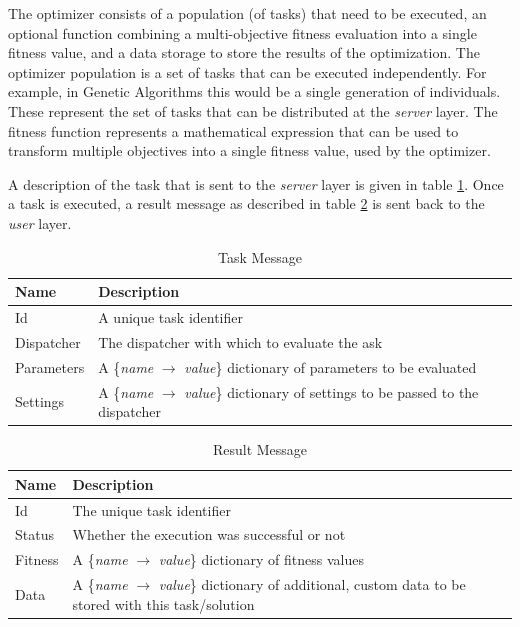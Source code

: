 \documentclass{article}
\begin{document}
The optimizer consists of a population (of tasks) that need to
be executed, an optional function combining a multi-objective fitness evaluation
into a single fitness value, and a data storage to store the results of the
optimization. The optimizer population is a set of tasks that can be executed
independently. For example, in Genetic Algorithms this would be a single
generation of individuals. These represent the set of tasks that can be
distributed at the \textit{server} layer. The fitness function represents
a mathematical expression that can be used to transform multiple objectives
into a single fitness value, used by the optimizer.

A description of the task that is sent to the \textit{server} layer
is given in table \ref{tab:task_message}. Once a task is executed, a result
message as described in table \ref{tab:result_message} is sent back to 
the \textit{user} layer.

\begin{table}[h!tb]\caption{Task Message}\label{tab:task_message}\vspace{0.1in}
	\centering

	\begin{tabular}{p{3cm} p{10cm}}
		\toprule
		\textbf{Name} & \textbf{Description} \\
		\midrule
		Id & A unique task identifier \\
		Dispatcher & The dispatcher with which to evaluate the ask \\
		Parameters & A \{\textit{name} $\rightarrow$ \textit{value}\} dictionary of
			         parameters to be evaluated \\
		Settings & A \{\textit{name} $\rightarrow$ \textit{value}\} dictionary of
			       settings to be passed to the dispatcher \\
		\bottomrule
	\end{tabular}
\end{table}

\begin{table}[h!tb]\caption{Result Message}\label{tab:result_message}\vspace{0.1in}
	\centering

	\begin{tabular}{p{3cm} p{10cm}}
		\toprule
		\textbf{Name} & \textbf{Description} \\
		\midrule
		Id & The unique task identifier \\
		Status & Whether the execution was successful or not \\
		Fitness & A \{\textit{name} $\rightarrow$ \textit{value}\} dictionary
		          of fitness values \\
		Data & A \{\textit{name} $\rightarrow$ \textit{value}\} dictionary
		          of additional, custom data to be stored with this task/solution \\
		\bottomrule
	\end{tabular}
\end{table}
\end{document}
